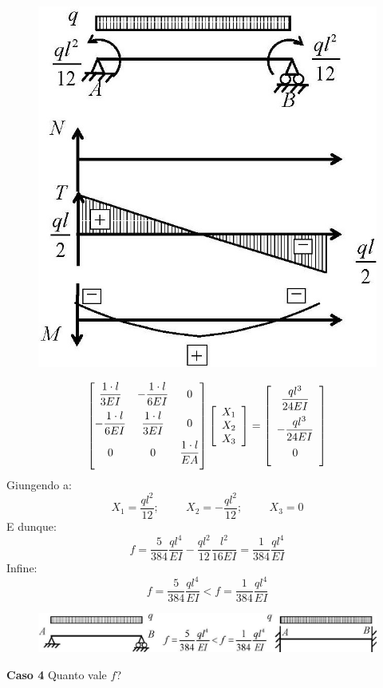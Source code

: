 \documentclass{article}
\begin{document}
\begin{adjustwidth}{2in}{}
\begin{figure}[H]
	\centering
	\includegraphics[width=0.4\linewidth]{"immagini/1.PARTE8_Pagina_58 (2)"}	
\end{figure}

		\[\left[ \begin{matrix}
			\dfrac{1\cdot l}{3EI} & -\dfrac{1\cdot l}{6EI} & 0 \vspace{0.2cm} \\
			-\dfrac{1\cdot l}{6EI} & \dfrac{1\cdot l}{3EI} & 0 \vspace{0.2cm} \\
			0 & 0 & \dfrac{1\cdot l}{EA} \vspace{0.2cm}
		\end{matrix}\right] \left[ \begin{array}{c}
		X_1 \\
		X_2 \\
		X_3
	\end{array}\right]  = \left[ \begin{array}{c}
	\dfrac{ql^3}{24EI} \vspace{0.2cm} \\
	- \dfrac{ql^3}{24EI}\vspace{0.2cm}  \\
	0 \vspace{0.2cm}  \end{array} \right]
	\]
	Giungendo a:
	\[ X_1 = \dfrac{ql^2}{12}; \hspace{1cm} X_2 = -\dfrac{ql^2}{12}; \hspace{1cm} X_3 = 0\]
	E dunque: 
	\[ f = \dfrac{5}{384}\dfrac{ql^4}{EI} - \dfrac{ql^2}{12}\dfrac{l^2}{16EI} = \dfrac{1}{384}\dfrac{ql^4}{EI}  \]
	Infine: 
	\[ f = \dfrac{5}{384}\dfrac{ql^4}{EI} < f = \dfrac{1}{384}\dfrac{ql^4}{EI} \]
	\begin{figure}[H]
		\centering
		\includegraphics[width=0.7\linewidth]{"immagini/1.PARTE8_Pagina_58"}	
	\end{figure}
\newpage		
\textbf{Caso 4}	\newline
		Quanto vale $f$? 


\end{adjustwidth}
\end{document}
